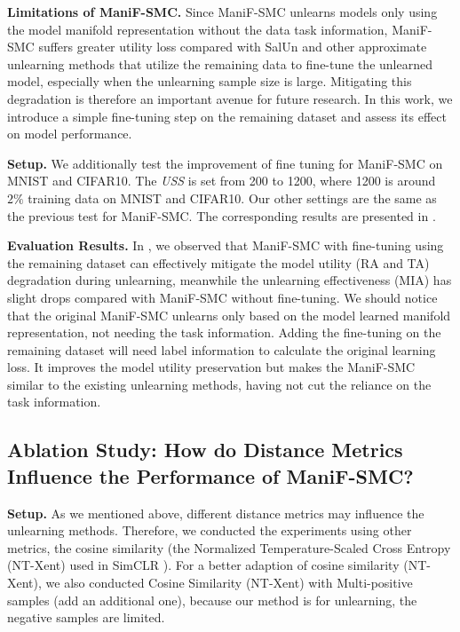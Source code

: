 \noindent
\textbf{Limitations of ManiF-SMC.} Since ManiF-SMC unlearns models only using the model manifold representation without the data task information, ManiF-SMC suffers greater utility loss compared with SalUn and other approximate unlearning methods that utilize the remaining data to fine-tune the unlearned model, especially when the unlearning sample size is large. Mitigating this degradation is therefore an important avenue for future research. In this work, we introduce a simple fine-tuning step on the remaining dataset and assess its effect on model performance.

\noindent
\textbf{Setup.} We additionally test the improvement of fine tuning for ManiF-SMC on MNIST and CIFAR10. The \textit{USS} is set from 200 to 1200, where 1200 is around $2\%$ training data on MNIST and CIFAR10. Our other settings are the same as the previous test for ManiF-SMC. The corresponding results are presented in . 
 
\noindent
\textbf{Evaluation Results.} In ,  we observed that ManiF-SMC with fine-tuning using the remaining dataset can effectively mitigate the model utility (RA and TA) degradation during unlearning, meanwhile the unlearning effectiveness (MIA) has slight drops compared with ManiF-SMC without fine-tuning. We should notice that the original ManiF-SMC unlearns only based on the model learned manifold representation, not needing the task information. Adding the fine-tuning on the remaining dataset will need label information to calculate the original learning loss. It improves the model utility preservation but makes the ManiF-SMC similar to the existing unlearning methods, having not cut the reliance on the task information.

 

\subsection{Ablation Study: How do Distance Metrics Influence the Performance of ManiF-SMC?} \label{distance_metrics_eval}


\noindent
\textbf{Setup.} 
As we mentioned above, different distance metrics may influence the unlearning methods. 
Therefore, we conducted the experiments using other metrics, the cosine similarity (the Normalized Temperature-Scaled Cross Entropy (NT-Xent) used in SimCLR \cite{chen2020simple}). For a better adaption of cosine similarity (NT-Xent), we also conducted Cosine Similarity (NT-Xent) with Multi-positive samples (add an additional one), because our method is for unlearning, the negative samples are limited.




